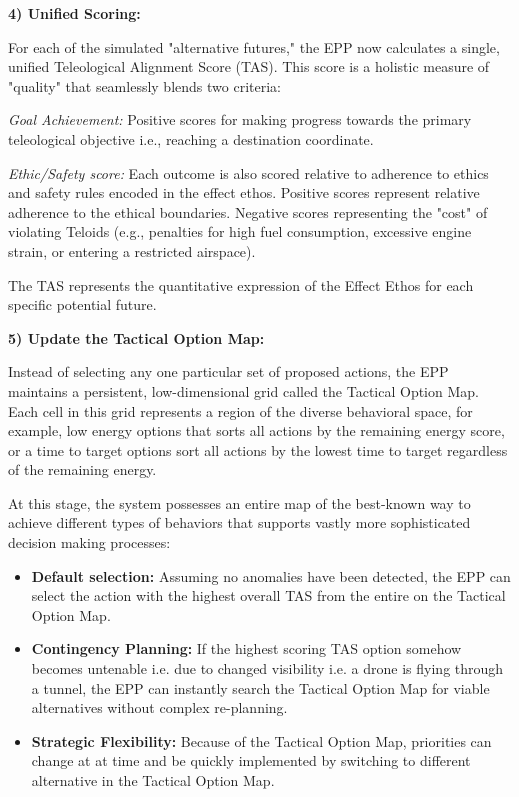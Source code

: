 \textbf{4) Unified Scoring:}

For each of the simulated "alternative futures," the EPP now calculates a single, unified Teleological Alignment Score (TAS). This score is a holistic measure of "quality" that seamlessly blends two criteria:

\textit{Goal Achievement:} Positive scores for making progress towards the primary teleological objective i.e., reaching a destination coordinate. 

\textit{Ethic/Safety score:} Each outcome is also scored relative to adherence to ethics and safety rules encoded in the effect ethos. Positive scores represent relative adherence to the ethical boundaries. Negative scores representing the "cost" of violating Teloids (e.g., penalties for high fuel consumption, excessive engine strain, or entering a restricted airspace).

The TAS represents the quantitative expression of the Effect Ethos for each specific potential future.

\textbf{5) Update the Tactical Option Map:}

Instead of selecting any one particular set of proposed actions, the EPP maintains a persistent, low-dimensional grid called the Tactical Option Map. Each cell in this grid represents a region of the diverse behavioral space, for example, low energy options that sorts all actions by the remaining energy score, or a time to target options sort all actions by the lowest time to target regardless of the remaining energy. 


At this stage, the system possesses an entire map of the best-known way to achieve different types of behaviors that supports vastly more sophisticated decision making processes:

\begin{itemize} 
	\item \textbf{Default selection:} Assuming no anomalies have been detected, the EPP can select the action with the highest overall TAS from the entire on the Tactical Option Map.
	\item \textbf{Contingency Planning:} If the highest scoring TAS option somehow becomes untenable i.e. due to changed visibility i.e. a drone is flying through a tunnel, the EPP can instantly search the Tactical Option Map for viable alternatives without complex re-planning. 
	\item \textbf{Strategic Flexibility:} Because of the  Tactical Option Map, priorities can change at at time and be quickly implemented by switching to different alternative in the Tactical Option Map. 
 
\end{itemize} 
 
